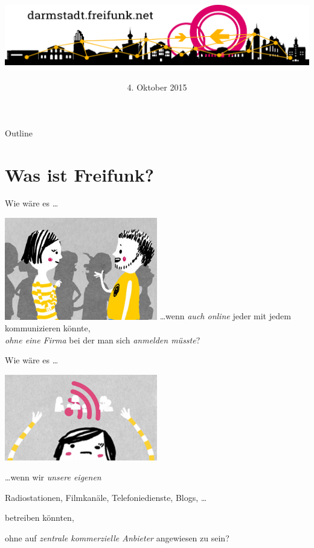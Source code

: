 \documentclass{beamer}
\title{\centering\includegraphics[width=\textwidth]{images/logo-skyline}}
\author{}
\date{\footnotesize 4. Oktober 2015}
\begin{document}
\begin{frame}
\maketitle
\end{frame}


\begin{frame}{Outline}
\tableofcontents
\end{frame}

\section{Was ist Freifunk?}
\begin{frame}{Wie wäre es \ldots}
	\vfill
	\begin{center}
		\includegraphics[width=0.5\textwidth]{images/talk}
		\vfill
		\ldots wenn \textit{auch online} jeder mit jedem kommunizieren könnte,\\
		\vfill
		\textit{ohne eine Firma} bei der man sich \textit{anmelden müsste}? \\
	\end{center}
	\vfill
\end{frame}

\begin{frame}{Wie wäre es \ldots}
	\begin{center}
		\includegraphics[width=0.5\textwidth]{images/up}

		\vfill
		\begin{flushleft}\ldots wenn wir \textit{unsere eigenen}\end{flushleft}
		\large Radiostationen, Filmkanäle, Telefoniedienste, Blogs, \ldots \normalsize
		\begin{flushright}betreiben könnten,\end{flushright}
		\vfill
		ohne auf \textit{zentrale kommerzielle Anbieter} angewiesen zu sein?
		\end{center}
	\vfill
\end{frame}
\end{document}
